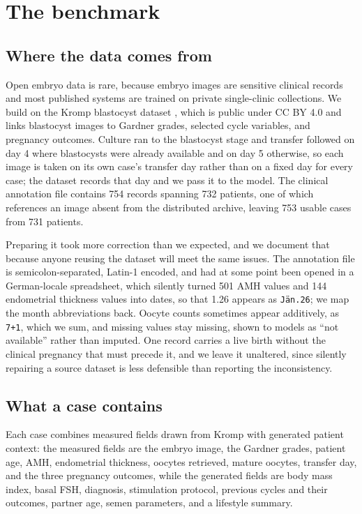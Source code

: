 \documentclass[11pt]{article}
\begin{document}
\section{The benchmark}

\subsection{Where the data comes from}

Open embryo data is rare, because embryo images are sensitive clinical records
and most published systems are trained on private single-clinic collections. We
build on the Kromp blastocyst dataset \citep{kromp2023}, which is public under CC
BY 4.0 and links blastocyst images to Gardner grades, selected cycle variables,
and pregnancy outcomes. Culture ran to the blastocyst stage and transfer followed
on day 4 where blastocysts were already available and on day 5 otherwise, so each
image is taken on its own case's transfer day rather than on a fixed day for
every case; the dataset records that day and we pass it to the model. The clinical annotation file contains 754 records spanning 732 patients, one of
which references an image absent from the distributed archive, leaving 753 usable
cases from 731 patients.

Preparing it took more correction than we expected, and we document that because
anyone reusing the dataset will meet the same issues. The annotation file is
semicolon-separated, Latin-1 encoded, and had at some point been opened in a
German-locale spreadsheet, which silently turned 501 AMH values and 144
endometrial thickness values into dates, so that 1.26 appears as
\texttt{J\"an.26}; we map the month abbreviations back. Oocyte counts sometimes
appear additively, as \texttt{7+1}, which we sum, and missing values stay
missing, shown to models as ``not available'' rather than imputed. One record
carries a live birth without the clinical pregnancy that must precede it, and we
leave it unaltered, since silently repairing a source dataset is less defensible
than reporting the inconsistency.

\subsection{What a case contains}

Each case combines measured fields drawn from Kromp with generated patient
context: the measured fields are the embryo image, the Gardner grades, patient
age, AMH, endometrial thickness, oocytes retrieved, mature oocytes, transfer day,
and the three pregnancy outcomes, while the generated fields are body mass index,
basal FSH, diagnosis, stimulation protocol, previous cycles and their outcomes,
partner age, semen parameters, and a lifestyle summary.
\end{document}
